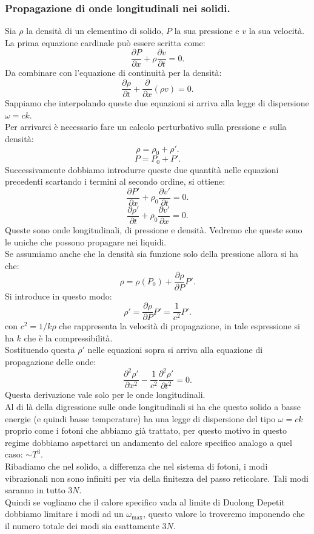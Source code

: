 \subsubsection{Propagazione di onde longitudinali nei solidi.}%
\label{subsub:Propagazione di onde longitudinali nei solidi.}
Sia $\rho$ la densità di un elementino di solido, $P$ la sua pressione e $v$ la sua velocità. La prima equazione cardinale può essere scritta come:
\[
	\frac{\partial P}{\partial x} + \rho \frac{\partial v}{\partial t} = 0
.\] 
Da combinare con l'equazione di continuità per la densità:
\[
	\frac{\partial \rho }{\partial t} +
	\frac{\partial }{\partial x} \left( \rho v \right) 
	= 
	0 
.\]  
Sappiamo che interpolando queste due equazioni si arriva alla legge di dispersione $\omega = c k$. \\
Per arrivarci è necessario fare un calcolo perturbativo sulla pressione e sulla densità:
\[
	\rho = \rho_0+ \rho ' 
.\] 
\[
	P = P_0 + P'
.\] 
Successivamente dobbiamo introdurre queste due quantità nelle equazioni precedenti scartando i termini al secondo ordine, si ottiene:
\[
	\frac{\partial P'}{\partial x} +
	\rho_0 \frac{\partial v'}{\partial t} 
	=
	0
.\] 
\[
	\frac{\partial \rho '}{\partial t} + 
	\rho_0 \frac{\partial v' }{\partial x} 
	=
	0  
.\] 
Queste sono onde longitudinali, di pressione e densità. Vedremo che queste sono le uniche che possono propagare nei liquidi. \\
Se assumiamo anche che la densità sia funzione solo della pressione allora si ha che:
\[
	\rho 
	=
	\rho ( P_0) +
	\frac{\partial \rho }{\partial P} P'
.\] 
Si introduce in questo modo:
\[
	\rho'
	= 
	\frac{\partial \rho }{\partial P} P' 
	=
	\frac{1}{c^2} P'
.\] 
con $c^2 = 1 / k\rho $ che rappresenta la velocità di propagazione, in tale espressione si ha $k$ che è la compressibilità. \\
Sostituendo questa $\rho '$ nelle equazioni sopra si arriva alla equazione di propagazione delle onde:
\[
	\frac{\partial ^2 \rho '}{\partial x^2} - 
	\frac{1}{c^2} \frac{\partial ^2\rho '}{\partial t^2} 
	= 
	0
.\] 
Questa derivazione vale solo per le onde longitudinali.\\
Al di là della digressione sulle onde longitudinali si ha che questo solido a basse energie (e quindi basse temperature) ha una legge di dispersione del tipo  $\omega = c k$ proprio come i fotoni che abbiamo già trattato, per questo motivo in questo regime dobbiamo aspettarci un andamento del calore specifico analogo a quel caso: $\sim T^3$.\\
Ribadiamo che nel solido, a differenza che nel sistema di fotoni, i modi vibrazionali non sono infiniti per via della finitezza del passo reticolare. Tali modi saranno in tutto $3N$.\\
Quindi se vogliamo che il calore specifico vada al limite di Duolong Depetit dobbiamo limitare i modi ad un $\omega _{\text{max}}$, questo valore lo troveremo imponendo che il numero totale dei modi sia esattamente $3N$.
